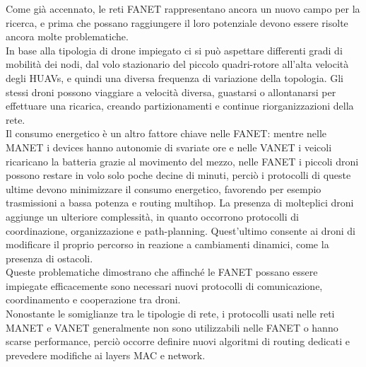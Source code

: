 Come già accennato, le reti FANET rappresentano ancora un nuovo campo per la ricerca, e prima che possano raggiungere il loro potenziale devono essere risolte ancora molte problematiche. \\
In base alla tipologia di drone impiegato ci si può aspettare differenti gradi di mobilità dei nodi, dal volo stazionario del piccolo quadri-rotore all'alta velocità degli HUAVs, e quindi una diversa frequenza di variazione della topologia. 
Gli stessi droni possono viaggiare a velocità diversa, guastarsi o allontanarsi per effettuare una ricarica, creando partizionamenti e continue riorganizzazioni della rete. \\
Il consumo energetico è un altro fattore chiave nelle FANET: mentre nelle MANET i devices hanno  autonomie di svariate ore e nelle VANET i veicoli ricaricano la batteria grazie al movimento del mezzo, nelle FANET i piccoli droni possono restare in volo solo poche decine di minuti, perciò i protocolli di queste ultime devono minimizzare il consumo energetico, favorendo per esempio trasmissioni a bassa potenza e routing multihop. 
La presenza di molteplici droni aggiunge un ulteriore complessità, in quanto occorrono protocolli di coordinazione, organizzazione e path-planning.
Quest'ultimo consente ai droni di modificare il proprio percorso in reazione a cambiamenti dinamici, come la presenza di ostacoli. \\
Queste problematiche dimostrano che affinché le FANET possano essere impiegate efficacemente sono necessari nuovi  protocolli di comunicazione, coordinamento e cooperazione tra droni. \\
Nonostante le somiglianze tra le tipologie di rete, i protocolli usati nelle reti MANET e VANET generalmente non sono utilizzabili nelle FANET o hanno scarse performance, perciò occorre definire nuovi algoritmi di routing dedicati e prevedere modifiche ai layers MAC e network.

